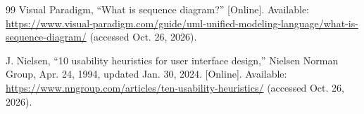 \begin{thebibliography}{99}
 Visual Paradigm, ``What is sequence diagram?'' [Online]. Available: \url{https://www.visual-paradigm.com/guide/uml-unified-modeling-language/what-is-sequence-diagram/} (accessed Oct. 26, 2026).

 J. Nielsen, ``10 usability heuristics for user interface design,'' Nielsen Norman Group, Apr. 24, 1994, updated Jan. 30, 2024. [Online]. Available: \url{https://www.nngroup.com/articles/ten-usability-heuristics/} (accessed Oct. 26, 2026).

\end{thebibliography}
